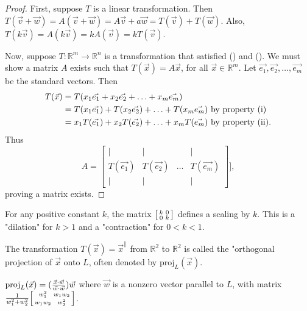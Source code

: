 \documentclass[a4paper,11pt]{article}
\begin{document}
\begin{outline}
    \begin{proof}
      \forward
        First, suppose \(T\) is a linear transformation. Then \(T(\vec{v} + \vec{w}) = A(\vec{v} + \vec{w})
        = A\vec{v} + a\vec{w} = T(\vec{v}) + T(\vec{w})\). Also, \(T(k\vec{v}) = A(k\vec{v}) = kA(\vec{v}) 
        = kT(\vec{v})\).
        
      \backward
        Now, suppose \(T: \mathbb{R}^m \rightarrow \mathbb{R}^n\) is a transformation that satisfied
        () and (). We must show a matrix \(A\) exists such that 
        \(T(\vec{x}) = A\vec{x}\), for all \(\vec{x} \in \mathbb{R}^m\). Let \(\vec{e_1}, \vec{e_2}, 
        \ldots, \vec{e_m}\) be the standard vectors. Then
        \begin{align*}
          T(\vec{x}) &= T(x_1\vec{e_1} + x_2\vec{e_2} + \ldots + x_m\vec{e_m})\\
                     &= T(x_1\vec{e_1}) + T(x_2\vec{e_2}) + \ldots + T(x_m\vec{e_m}) 
                        \text{ by property (\romannumeral 1)}\\
                     &= x_1T(\vec{e_1}) + x_2T(\vec{e_2}) + \ldots + x_mT(\vec{e_m}) 
                        \text{ by property (\romannumeral 2).}
        \end{align*}
        Thus 
        \[ A = \begin{bmatrix}
          \vert        & \vert        &        & \vert       \\
          T(\vec{e_1}) & T(\vec{e_2}) & \ldots & T(\vec{e_m})\\
          \vert        & \vert        &        & \vert       \end{bmatrix}], 
        \] proving a matrix exists.
    \end{proof}
    
    For any positive constant \(k\), the matrix \(\begin{bsmallmatrix} k&0\\ 0&k \end{bsmallmatrix}\) defines
    a scaling by \(k\). This is a "dilation" for \(k > 1\) and a "contraction" for \(0 < k < 1\).
    
    The transformation \(T(\vec{x}) = \vec{x}^{\parallel}\) from \(\mathbb{R}^2\) to \(\mathbb{R}^2\)
    is called the "orthogonal projection of \(\vec{x}\) onto \(L\), often denoted by \(\text{proj}_{L}(\vec{x})\).
    
    \(\text{proj}_{L}(\vec{x}) = (\frac{\vec{x}\cdot\vec{w}}{\vec{w}\cdot\vec{w}})\vec{w}\) 
    where \(\vec{w}\) is a nonzero vector parallel to \(L\), with matrix \(\frac{1}{w_1^2 + w_2^2}
    \begin{bsmallmatrix} w_1^2&w_1w_2\\ w_1w_2&w_2^2 \end{bsmallmatrix}\).
    

\end{outline}
\end{document}
